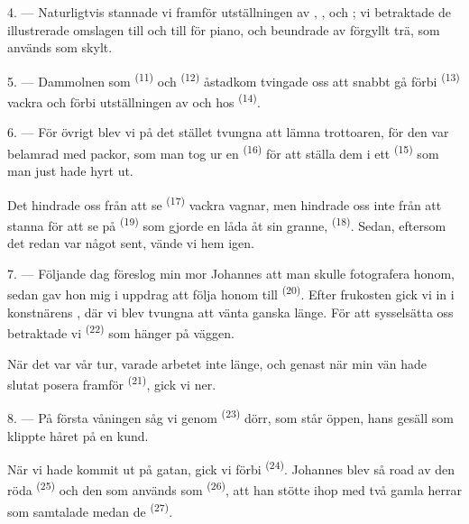 \VUsaut{3.0mm}

4. --- Naturligtvis stannade vi framför utställningen av
, ,  och
; vi betraktade de illustrerade omslagen till
 och till  för piano, och beundrade
 av förgyllt trä, som används som skylt.

5. --- Dammolnen som  \textsuperscript{(11)} och
 \textsuperscript{(12)} åstadkom tvingade oss att snabbt gå
förbi  \textsuperscript{(13)} vackra
 och förbi utställningen av  och
 hos  \textsuperscript{(14)}.

6. --- För övrigt blev vi på det stället tvungna att lämna trottoaren, för den var belamrad
med packor, som man tog ur en  \textsuperscript{(16)} för att ställa dem i
ett  \textsuperscript{(15)} som man just hade hyrt ut.

Det hindrade oss från att se  \textsuperscript{(17)} vackra vagnar, men
hindrade oss inte från att stanna för att se på
 \textsuperscript{(19)} som gjorde en låda åt sin granne,
 \textsuperscript{(18)}. Sedan, eftersom
det redan var något sent, vände vi hem igen.

\VUsaut{3.0mm}

7. --- Följande dag föreslog min mor Johannes att man skulle fotografera honom, sedan gav hon
mig i uppdrag att följa honom till  \textsuperscript{(20)}. Efter frukosten
gick vi in i konstnärens
, där vi blev tvungna att vänta ganska länge. För att sysselsätta
oss betraktade vi  \textsuperscript{(22)} som hänger på väggen.

När det var vår tur, varade arbetet inte länge, och genast när min vän hade slutat posera
framför  \textsuperscript{(21)}, gick vi ner.

8. --- På första våningen såg vi genom  \textsuperscript{(23)} dörr, som
står öppen, hans gesäll som klippte håret på en kund.

När vi hade kommit ut på gatan, gick vi förbi  \textsuperscript{(24)}.
Johannes blev så road av den röda  \textsuperscript{(25)} och den
 som används som
 \textsuperscript{(26)}, att han stötte ihop med två gamla herrar
som samtalade medan de  \textsuperscript{(27)}.

